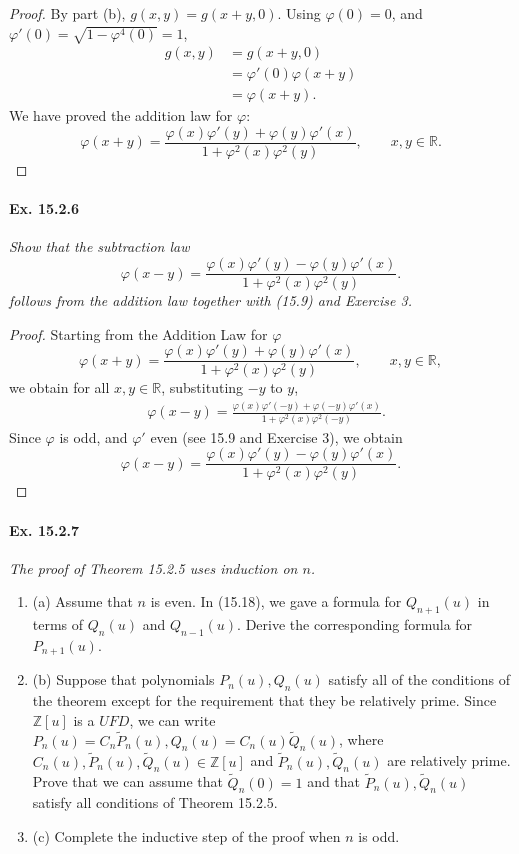 \documentclass[11pt,a4paper]{article}
\newcommand{\be} {\begin{enumerate}}
\newcommand{\ee} {\end{enumerate}}
\newcommand{\Z}{\mathbb{Z}}
\newcommand{\R}{\mathbb{R}}
\begin{document}
\begin{proof}
By part (b), $g(x,y) =g(x+y,0)$. Using $\varphi(0) = 0$, and $\varphi'(0) = \sqrt{1 - \varphi^4(0)} = 1$, 
\begin{align*}
g(x,y) &=g(x+y,0)\\
&= \varphi'(0) \varphi(x+y)\\
&= \varphi(x+y).
\end{align*}
We have proved the addition law for $\varphi$:
$$\varphi(x+y) = \frac{\varphi(x) \varphi'(y) + \varphi(y) \varphi'(x)}{1 + \varphi^2(x) \varphi^2(y)}, \qquad x,y \in \R.$$
\end{proof}

\paragraph{Ex. 15.2.6}{\it Show that the subtraction law
$$\varphi(x-y) = \frac{\varphi(x) \varphi'(y) - \varphi(y) \varphi'(x)}{1 + \varphi^2(x) \varphi^2(y)}.
$$
follows from the addition law together with (15.9) and Exercise 3.
}

\begin{proof} Starting from the Addition Law for $\varphi$
$$\varphi(x+y) = \frac{\varphi(x) \varphi'(y) + \varphi(y) \varphi'(x)}{1 + \varphi^2(x) \varphi^2(y)}, \qquad x,y \in \R,$$
we obtain for all $x,y \in \R$, substituting $-y$ to $y$,
\begin{align*}
&\varphi(x-y) = \frac{\varphi(x) \varphi'(-y) + \varphi(-y) \varphi'(x)}{1 + \varphi^2(x) \varphi^2(-y)}.
\end{align*}
Since $\varphi$ is odd, and $\varphi'$ even (see 15.9 and Exercise 3), we obtain
$$\varphi(x-y) = \frac{\varphi(x) \varphi'(y) - \varphi(y) \varphi'(x)}{1 + \varphi^2(x) \varphi^2(y)}.
$$
\end{proof}

\paragraph{Ex. 15.2.7}{\it The proof of Theorem 15.2.5 uses induction on $n$.
\be
\item[(a)] Assume that $n$ is even. In (15.18), we gave a formula for $Q_{n+1}(u)$ in terms of $Q_n(u)$ and $Q_{n-1}(u)$. Derive the corresponding formula for $P_{n+1}(u)$.
\item[(b)] Suppose that polynomials $P_n(u),Q_n(u)$ satisfy all of the conditions of the theorem except for the requirement that they be relatively prime. Since $\Z[u]$ is a $UFD$, we can write $P_n(u) = C_n \tilde{P}_n(u), Q_n(u) = C_n(u) \tilde{Q}_n(u)$, where $C_n(u), \tilde P_n(u),\tilde Q_n(u) \in \Z[u]$ and $\tilde P_n(u), \tilde Q_n(u)$ are relatively prime. Prove that we can assume that $\tilde Q_n(0) = 1$ and that $\tilde P_n(u), \tilde Q_n(u)$ satisfy all conditions of Theorem 15.2.5.
\item[(c)] Complete the inductive step of the proof when $n$ is odd.
\ee
}
\end{document}
